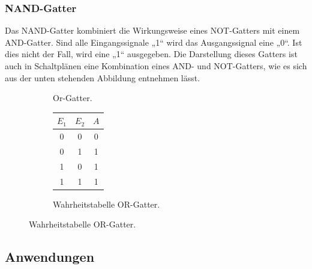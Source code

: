   \subsubsection{NAND-Gatter}
    Das NAND-Gatter kombiniert die Wirkungsweise eines NOT-Gatters mit einem AND-Gatter. 
    Sind alle Eingangssignale „1“ wird das Ausgangssignal eine „0“. Ist dies nicht der Fall,
     wird eine „1“ ausgegeben.
    Die Darstellung dieses Gatters ist auch in Schaltplänen eine Kombination eines AND- und NOT-Gatters, wie es sich aus der unten stehenden Abbildung entnehmen lässt.
              \begin{figure}[H]
       \begin{subfigure}[t]{0.48\textwidth}%
        \centering
        \caption{Or-Gatter.\cite{tikz}}
        \vspace{15pt}
      \end{subfigure}
      \hfill
      \begin{subfigure}[t]{0.48\textwidth}
        \centering
        \vspace{0pt}
        \caption{Wahrheitstabelle OR-Gatter.\cite{digbau}}
        \begin{tabular}{c c c}
          \toprule
          $E_1$ & $E_2$ & $A$\\
          \midrule
          0 & 0 & 0\\
          0 & 1  & 1\\
          1 & 0  & 1\\
          1 & 1 & 1 \\
          \bottomrule
        \end{tabular}
      \end{subfigure}
    \end{figure}
\subsection{Anwendungen}
